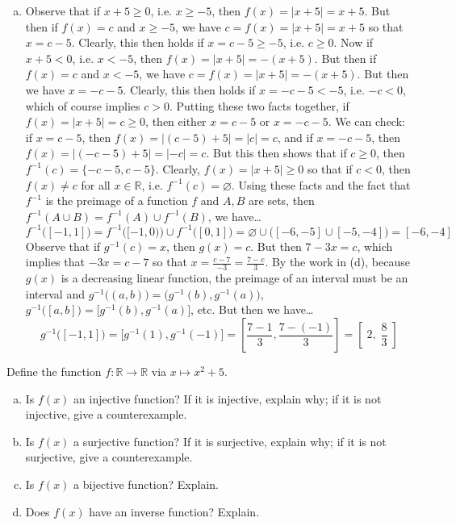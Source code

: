 \documentclass[12pt,letterpaper]{exam}
\begin{document}
\begin{questions}
{\begin{enumerate}[(a)]
\item Observe that if $x + 5 \geq 0$, i.e. $x \geq -5$, then $f(x)= |x + 5|= x + 5$. But then if $f(x)= c$ and $x \geq -5$, we have $c= f(x)= |x + 5|= x + 5$ so that $x= c - 5$. Clearly, this then holds if $x= c - 5 \geq -5$, i.e. $c \geq 0$. Now if $x + 5 < 0$, i.e. $x < -5$, then $f(x)= |x + 5|= -(x + 5)$. But then if $f(x)= c$ and $x < -5$, we have $c= f(x)= |x + 5|= -(x + 5)$. But then we have $x= -c - 5$. Clearly, this then holds if $x= -c - 5 < -5$, i.e. $-c < 0$, which of course implies $c > 0$. Putting these two facts together, if $f(x)= |x + 5|= c \geq 0$, then either $x= c - 5$ or $x= -c - 5$. We can check: if $x= c - 5$, then $f(x)= |(c - 5) + 5|= |c|= c$, and if $x= -c - 5$, then $f(x)= |(-c - 5) + 5|= |-c|= c$. But this then shows that if $c \geq 0$, then $f^{-1}(c)= \{ -c - 5, c - 5 \}$. Clearly, $f(x)= |x + 5| \geq 0$ so that if $c < 0$, then $f(x) \neq c$ for all $x \in \mathbb{R}$, i.e. $f^{-1}(c)= \varnothing$. Using these facts and the fact that $f^{-1}$ is the preimage of a function $f$ and $A, B$ are sets, then $f^{-1}(A \cup B)= f^{-1}(A) \cup f^{-1}(B)$, we have\dots	
	\[
	f^{-1} \big( [-1,1] \big)= f^{-1} \big( [-1,0) \big) \cup f^{-1} \big( [0, 1] \big)= \varnothing \cup \big( [-6, -5] \cup [-5, -4] \big)= [-6, -4]
	\]
Observe that if $g^{-1}(c)= x$, then $g(x)= c$. But then $7 - 3x= c$, which implies that $-3x= c - 7$ so that $x= \frac{c - 7}{-3}= \frac{7 - c}{3}$. By the work in (d), because $g(x)$ is a decreasing linear function, the preimage of an interval must be an interval and $g^{-1} \big( (a, b) \big)= \big( g^{-1}(b), g^{-1}(a) \big)$, $g^{-1} \big( [a, b] \big)= \big[ g^{-1}(b), g^{-1}(a) \big]$, etc. But then we have\dots
	\[
	g^{-1} \big( [-1, 1] \big)= \big[ g^{-1}(1), g^{-1}(-1) \big]= \left[ \dfrac{7 - 1}{3}, \dfrac{7 - (-1)}{3} \right]= \left[\; 2, \;\dfrac{8}{3}\; \right]
	\]
\end{enumerate}
}



\newpage
\question[10] Define the function $f: \mathbb{R} \to \mathbb{R}$ via $x \mapsto x^2 + 5$. 
	\begin{enumerate}[(a)]
	\item Is $f(x)$ an injective function? If it is injective, explain why; if it is not injective, give a counterexample. 
	\item Is $f(x)$ a surjective function? If it is surjective, explain why; if it is not surjective, give a counterexample. 
	\item Is $f(x)$ a bijective function? Explain. 
	\item Does $f(x)$ have an inverse function? Explain. 
	\end{enumerate} \pspace


\end{questions}
\end{document}
